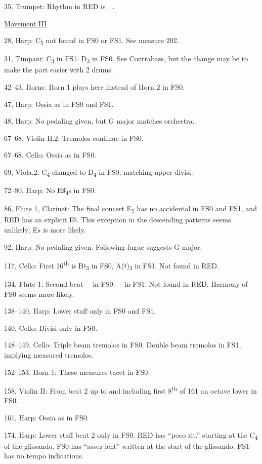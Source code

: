 \documentclass[twoside]{article}
\begin{document}
\begin{hangparas}{15pt}{1}
\begin{multicols}{2}
35, Trumpet: Rhythm in RED is \SechBr \Vier\,\Pu\ .

\underline{Movement III}

28, Harp: C\textsubscript{5} not found in FS0 or FS1. See measure 202.

31, Timpani: C\textsubscript{3} in FS1. D\textsubscript{3} in FS0. See Contrabass, but the change may be to make the part easier with 2 drums.

42--43, Horns: Horn 1 plays here instead of Horn 2 in FS0.

47, Harp: Ossia as in FS0 and FS1.

48, Harp: No pedaling given, but G major matches orchestra. 

67--68, Violin II.2: Tremolos continue in FS0.

67--68, Cello: Ossia as in FS0.

69, Viola.2: C\textsubscript{4} changed to D\textsubscript{4} in FS0, matching upper divisi.

72--80, Harp: No E♯\textsubscript{4}s in FS0.

86, Flute 1, Clarinet: The final concert E\textsubscript{5} has no accidental in FS0 and FS1, and RED has an explicit E♮. This exception in the descending patterns seems unlikely; E♭ is more likely. 

92, Harp: No pedaling given. Following fugue suggests G major.

117, Cello: First 16\textsuperscript{th} is B♮\textsubscript{3} in FS0, A(♮)\textsubscript{3} in FS1. Not found in RED. 

134, Flute 1: Second beat \SechBR \Vier \AchtBL\ \ in FS0. \AchtBR \Vier \SechBL\ \ in FS1. Not found in RED. Harmony of FS0 seems more likely.

138--140, Harp: Lower staff only in FS0 and FS1.

140, Cello: Divisi only in FS0.

148--149, Cello: Triple beam tremolos in FS0. Double beam tremolos in FS1, implying measured tremolos.

152--153, Horn 1: These measures tacet in FS0.

158, Violin II: From beat 2 up to and including first 8\textsuperscript{th} of 161 an octave lower in FS0.

161, Harp: Ossia as in FS0.

174, Harp: Lower staff beat 2 only in FS0. RED has ``poco rit.'' starting at the C\textsubscript{4} of the glissando. FS0 has ``assez lent'' written at the start of the glissando. FS1 has no tempo indications.


\end{multicols}
\end{hangparas}
\end{document}
